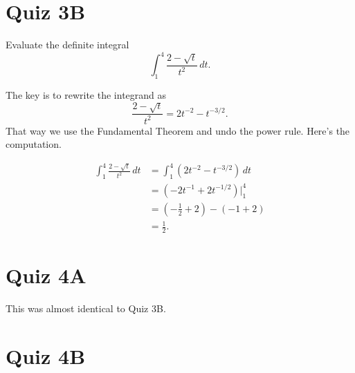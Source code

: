 \documentclass{ximera}
\begin{document}
\section{Quiz 3B}

\begin{question} \label{QKDFefggg}
Evaluate the definite integral
\[
  \int_1^4 \frac{2-\sqrt{t}}{t^2} \, dt.
\]

\begin{explanation}
The key is to rewrite the integrand as
\[
  \frac{2-\sqrt{t}}{t^2} = 2t^{-2} - t^{-3/2} .
\]
That way we use the Fundamental Theorem and undo the power rule. Here's the computation.

\begin{align*}
\int_1^4 \frac{2-\sqrt{t}}{t^2} \, dt  &= \int_1^4 (  2t^{-2} - t^{-3/2}  )\, dt  \\
                                                      &= \left(  -2t^{-1} + 2t^{-1/2}   \right)\Big|_1^4 \\
                                                      &= (-\frac{1}{2} + 2)  -(-1 + 2) \\
                                                       &=\frac{1}{2} .
\end{align*}

\end{explanation}

\end{question}


\section{Quiz 4A}
This was almost identical to Quiz 3B.


\section{Quiz 4B}
\end{document}
